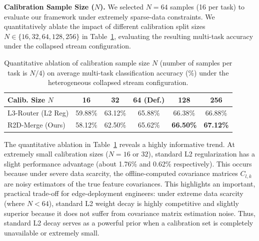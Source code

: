\textbf{Calibration Sample Size ($N$).} We selected $N=64$ samples (16 per task) to evaluate our framework under extremely sparse-data constraints. We quantitatively ablate the impact of different calibration split sizes $N \in \{16, 32, 64, 128, 256\}$ in Table~\ref{tab:ablation_n}, evaluating the resulting multi-task accuracy under the collapsed stream configuration.

\begin{table}[t]
\caption{Quantitative ablation of calibration sample size $N$ (number of samples per task is $N/4$) on average multi-task classification accuracy (\%) under the heterogeneous collapsed stream configuration.}
\label{tab:ablation_n}
\vskip 0.15in
\begin{center}
\begin{footnotesize}
\begin{sc}
\begin{tabular}{lccccc}
\toprule
Calib. Size $N$ & 16 & 32 & 64 (Def.) & 128 & 256 \\
\midrule
L3-Router (L2 Reg) & 59.88\% & 63.12\% & 65.88\% & 66.38\% & 66.88\% \\
R2D-Merge (Ours) & 58.12\% & 62.50\% & 65.62\% & \textbf{66.50\%} & \textbf{67.12\%} \\
\bottomrule
\end{tabular}
\end{sc}
\end{footnotesize}
\end{center}
\vskip -0.1in
\end{table}

The quantitative ablation in Table~\ref{tab:ablation_n} reveals a highly informative trend. At extremely small calibration sizes ($N=16$ or $32$), standard L2 regularization has a slight performance advantage (about 1.76\% and 0.62\% respectively). This occurs because under severe data scarcity, the offline-computed covariance matrices $C_{l, k}$ are noisy estimators of the true feature covariances. This highlights an important, practical trade-off for edge-deployment engineers: under extreme data scarcity (where $N < 64$), standard L2 weight decay is highly competitive and slightly superior because it does not suffer from covariance matrix estimation noise. Thus, standard L2 decay serves as a powerful prior when a calibration set is completely unavailable or extremely small.

